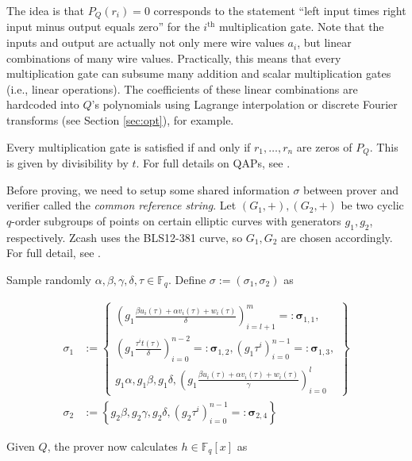 \documentclass{article}
\begin{document}
The idea is that $P_Q(r_i) = 0$ corresponds to the statement ``left input times right input minus output equals zero'' for the $i^\text{th}$ multiplication gate.
Note that the inputs and output are actually not only mere wire values $a_i$, but linear combinations of many wire values.
Practically, this means that every multiplication gate can subsume many addition and scalar multiplication gates (i.e., linear operations).
The coefficients of these linear combinations are hardcoded into $Q$'s polynomials using Lagrange interpolation or discrete Fourier transforms (see Section \ref{sec:opt}), for example.

Every multiplication gate is satisfied if and only if $r_1,\ldots,r_n$ are zeros of $P_Q$.
This is given by divisibility by $t$.
For full details on QAPs, see \cite{gennaro:qap}.

Before proving, we need to setup some shared information $\sigma$ between prover and verifier called the \textit{common reference string}.
Let $(G_1, +), (G_2, +)$ be two cyclic $q$-order subgroups of points on certain elliptic curves with generators $g_1, g_2$, respectively.
Zcash uses the BLS12-381\cite{barreto:bls} curve, so $G_1,G_2$ are chosen accordingly.
For full detail, see \cite{hopwood:zcash}.

Sample randomly $\alpha, \beta, \gamma, \delta, \tau \in \mathbb{F}_q$. Define $\sigma := (\sigma_1, \sigma_2)$ as

\begin{adjustbox}{max width=.5\textwidth}
\parbox{\linewidth}{
\begin{align*}
        \sigma_1 &:= \left\{\begin{aligned}\left(g_1\frac{\beta u_i(\tau) + \alpha v_i(\tau) + w_i(\tau)}{\delta}\right)_{i=l+1}^m =: \boldsymbol\sigma_{1,1},\\
        \left(g_1\frac{\tau^i t(\tau)}{\delta}\right)_{i=0}^{n-2} =: \boldsymbol\sigma_{1,2}, \left(g_1{\tau^i}\right)_{i=0}^{n-1} =: \boldsymbol\sigma_{1,3},\\
        g_1\alpha, g_1\beta, g_1\delta, \left(g_1\frac{\beta u_i(\tau) + \alpha v_i(\tau) + w_i(\tau)}{\gamma}\right)_{i=0}^l\end{aligned}\right\} \\
        \sigma_2 &:= \left\{g_2\beta, g_2\gamma, g_2\delta, (g_2{\tau^i})_{i=0}^{n-1} =: \boldsymbol\sigma_{2,4}\right\}
\end{align*}}
\end{adjustbox}

Given $Q$, the prover now calculates $h \in \mathbb{F}_q[x]$ as
\end{document}
